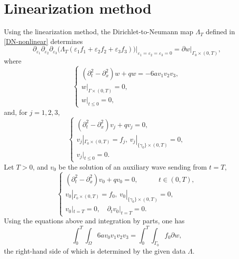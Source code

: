 \documentclass[11pt]{amsart}
\theoremstyle{definition}
\theoremstyle{plain}
\numberwithin{equation}{section}
\begin{document}
\section{Linearization method}
\label{sec-linearization}

Using the linearization method, the Dirichlet-to-Neumann map $\Lambda_T$ defined in \eqref{DN-nonlinear} determines
\begin{equation}
\partial_{\varepsilon_1} \partial_{\varepsilon_2} 
\partial_{\varepsilon_3}
\Big(\Lambda_T (\varepsilon_1 f_1+ \varepsilon_2 f_2+\varepsilon_3 f_3)\Big)  \Big|_{\varepsilon_1=\varepsilon_2=\varepsilon_3=0} = \partial w \big|_{\Gamma_0 \times (0,T)},
\end{equation}
where 
\begin{equation} \label{nonlinear_w}
\begin{cases}
(\partial_{t}^2-\partial_x^2) w +qw = -6a v_1 v_2 v_3, \\
w|_{\Gamma\times (0,T)}=0, \\
w|_{t\leq 0}=0,
\end{cases}
\end{equation}
and, for $j=1,2,3$,
\begin{equation}
\begin{cases}
(\partial_{t}^2-\partial_x^2) v_j +q v_j= 0, \\
v_j|_{\Gamma_0\times (0,T)}=f_j, \ v_j|_{\{\gamma_0\}\times (0,T)}=0, \\
v_j|_{t\leq 0}=0.
\end{cases}
\end{equation}
Let $T>0$, and $v_0$ be the solution of an auxiliary wave sending from $t=T$,
\begin{equation}
\begin{cases}
(\partial_{t}^2-\partial_x^2) v_0 +q v_0= 0, \quad\quad\quad t\in (0,T), \\
v_0|_{\Gamma_0\times (0,T)}=f_0,  \ v_0|_{\{\gamma_0\}\times (0,T)}=0, \\
v_0|_{t= T}=0, \quad \partial_t v_0|_{t= T}=0.
\end{cases}
\end{equation}
Using the equations above and integration by parts, one has
\begin{equation} \label{a-integral}
\int_0^T \int_{\Omega} 6av_0 v_1 v_2 v_3 = \int_0^T \int_{\Gamma_0} f_0 \partial w,
\end{equation}
the right-hand side of which is determined by the given data $\Lambda$.
\end{document}
